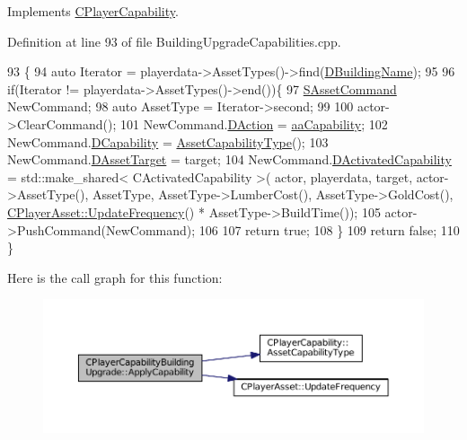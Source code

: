 Implements \hyperlink{classCPlayerCapability_a2ca6fd7fbd9c0178f1cf1d049c63825f}{C\+Player\+Capability}.



Definition at line 93 of file Building\+Upgrade\+Capabilities.\+cpp.


\begin{DoxyCode}
93                                                                                                            
                                                                   \{
94     \textcolor{keyword}{auto} Iterator = playerdata->AssetTypes()->find(\hyperlink{classCPlayerCapabilityBuildingUpgrade_a244e767a3e669441cfb03c13bf703e64}{DBuildingName});
95     
96     \textcolor{keywordflow}{if}(Iterator != playerdata->AssetTypes()->end())\{
97         \hyperlink{structSAssetCommand}{SAssetCommand} NewCommand;
98         \textcolor{keyword}{auto} AssetType = Iterator->second;
99         
100         actor->ClearCommand();
101         NewCommand.\hyperlink{structSAssetCommand_a8edd3b3d59a76d5514ba403bc8076a75}{DAction} = \hyperlink{GameDataTypes_8h_ab47668e651a3032cfb9c40ea2d60d670acf9fb164e8abd71c71f4a8c7fda360d4}{aaCapability};
102         NewCommand.\hyperlink{structSAssetCommand_a734ea7c6847457b437360f333f570ff9}{DCapability} = \hyperlink{classCPlayerCapability_a433bb196cd6ab6a932f1cac102b3aa98}{AssetCapabilityType}();
103         NewCommand.\hyperlink{structSAssetCommand_a3d9b43f6e59c386c48c41a65448a0c39}{DAssetTarget} = target;
104         NewCommand.\hyperlink{structSAssetCommand_ad8beda19520811cc70fe1eab16c774dd}{DActivatedCapability} = std::make\_shared< CActivatedCapability >(
      actor, playerdata, target, actor->AssetType(), AssetType, AssetType->LumberCost(), AssetType->GoldCost(), 
      \hyperlink{classCPlayerAsset_a0aff85b9552967a42f4f3f42cb59c19f}{CPlayerAsset::UpdateFrequency}() * AssetType->BuildTime());
105         actor->PushCommand(NewCommand);
106         
107         \textcolor{keywordflow}{return} \textcolor{keyword}{true};
108     \}
109     \textcolor{keywordflow}{return} \textcolor{keyword}{false};
110 \}
\end{DoxyCode}
Here is the call graph for this function\+:\nopagebreak
\begin{figure}[H]
\begin{center}
\leavevmode
\includegraphics[width=350pt]{classCPlayerCapabilityBuildingUpgrade_a5e71446b74307f31ce6d6e9bbfd9a681_cgraph}
\end{center}
\end{figure}
